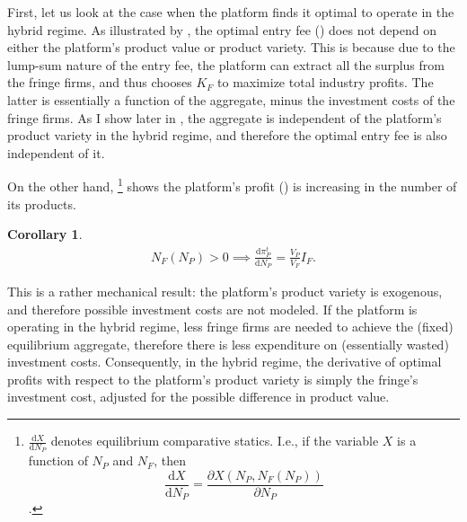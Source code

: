 \documentclass[a4paper]{article}
\newtheorem{corollary}{Corollary}
\newcommand{\dd}{\mathrm{d}}
\begin{document}
First, let us look at the case when the platform finds it optimal to operate in the hybrid regime.
As illustrated by , the optimal entry fee () does not depend on either the platform's product value or product variety.
This is because due to the lump-sum nature of the entry fee, the platform can extract all the surplus from the fringe firms, and thus chooses $K_F$ to maximize total industry profits.
The latter is essentially a function of the aggregate, minus the investment costs of the fringe firms.
As I show later in , the aggregate is independent of the platform's product variety in the hybrid regime, and therefore the optimal entry fee is also independent of it.

On the other hand, \footnote{
    $\frac{\dd X}{\dd N_P}$ denotes equilibrium comparative statics.
    I.e., if the variable $X$ is a function of $N_P$ and $N_F$, then $$\frac{\dd X}{\dd N_P} = \frac{\partial X(N_P, N_F(N_P))}{\partial N_P}$$.
} shows the platform's profit () is increasing in the number of its products.
\begin{corollary}
    \label{prop:platform_profits_comparative_benchmark}
    \begin{align*}
        N_F(N_P) > 0 \implies \frac{\dd \pi_P^t}{\dd N_P} = \frac{V_P}{V_F} I_F.
    \end{align*}
\end{corollary}
This is a rather mechanical result: the platform's product variety is exogenous, and therefore possible investment costs are not modeled.
If the platform is operating in the hybrid regime, less fringe firms are needed to achieve the (fixed) equilibrium aggregate, therefore there is less expenditure on (essentially wasted) investment costs.
Consequently, in the hybrid regime, the derivative of optimal profits with respect to the platform's product variety is simply the fringe's investment cost, adjusted for the possible difference in product value.
\end{document}
